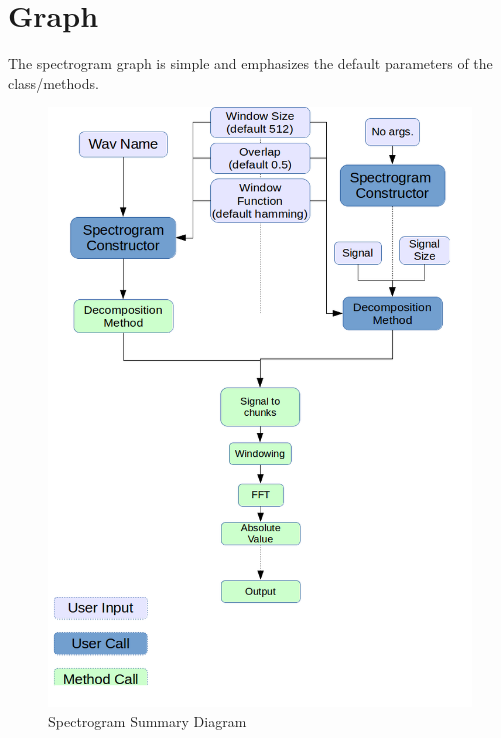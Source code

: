 \documentclass[a4paper]{report}
\begin{document}
\section{Graph}
The spectrogram graph is simple and emphasizes the default parameters of the class/methods.
\begin{figure}[H]
\begin{center}
\includegraphics[scale=0.31]{spectro_diagram.png}\caption{Spectrogram Summary Diagram}
\end{center}
\end{figure}
\end{document}

